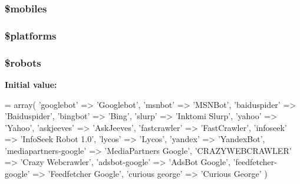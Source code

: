 \subsubsection[{\$mobiles}]{\setlength{\rightskip}{0pt plus 5cm}\$mobiles}\label{_admin_2application_2config_2user__agents_8php_a6928dde5aa0be443766d5b2376de908a}
\hypertarget{_admin_2application_2config_2user__agents_8php_a1c1a0a860242698ee6b3f4ef7d6eb343}{}
\subsubsection[{\$platforms}]{\setlength{\rightskip}{0pt plus 5cm}\$platforms}\label{_admin_2application_2config_2user__agents_8php_a1c1a0a860242698ee6b3f4ef7d6eb343}
\hypertarget{_admin_2application_2config_2user__agents_8php_a5752e2a66d1c03bc34666492746037ab}{}
\subsubsection[{\$robots}]{\setlength{\rightskip}{0pt plus 5cm}\$robots}\label{_admin_2application_2config_2user__agents_8php_a5752e2a66d1c03bc34666492746037ab}
{\bfseries Initial value\+:}
\begin{DoxyCode}
= array(
    \textcolor{stringliteral}{'googlebot'}     => \textcolor{stringliteral}{'Googlebot'},
    \textcolor{stringliteral}{'msnbot'}        => \textcolor{stringliteral}{'MSNBot'},
    \textcolor{stringliteral}{'baiduspider'}       => \textcolor{stringliteral}{'Baiduspider'},
    \textcolor{stringliteral}{'bingbot'}       => \textcolor{stringliteral}{'Bing'},
    \textcolor{stringliteral}{'slurp'}         => \textcolor{stringliteral}{'Inktomi Slurp'},
    \textcolor{stringliteral}{'yahoo'}         => \textcolor{stringliteral}{'Yahoo'},
    \textcolor{stringliteral}{'askjeeves'}     => \textcolor{stringliteral}{'AskJeeves'},
    \textcolor{stringliteral}{'fastcrawler'}       => \textcolor{stringliteral}{'FastCrawler'},
    \textcolor{stringliteral}{'infoseek'}      => \textcolor{stringliteral}{'InfoSeek Robot 1.0'},
    \textcolor{stringliteral}{'lycos'}         => \textcolor{stringliteral}{'Lycos'},
    \textcolor{stringliteral}{'yandex'}        => \textcolor{stringliteral}{'YandexBot'},
    \textcolor{stringliteral}{'mediapartners-google'}  => \textcolor{stringliteral}{'MediaPartners Google'},
    \textcolor{stringliteral}{'CRAZYWEBCRAWLER'}   => \textcolor{stringliteral}{'Crazy Webcrawler'},
    \textcolor{stringliteral}{'adsbot-google'}     => \textcolor{stringliteral}{'AdsBot Google'},
    \textcolor{stringliteral}{'feedfetcher-google'}    => \textcolor{stringliteral}{'Feedfetcher Google'},
    \textcolor{stringliteral}{'curious george'}    => \textcolor{stringliteral}{'Curious George'}
)
\end{DoxyCode}

